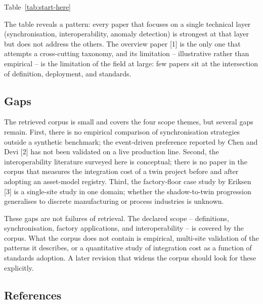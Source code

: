 \documentclass[
  12pt,
  a4paper,
]{article}
\begin{document}
Table~\ref{tab:start-here}

The table reveals a pattern: every paper that focuses on a single
technical layer (synchronisation, interoperability, anomaly detection)
is strongest at that layer but does not address the others. The overview
paper {[}1{]} is the only one that attempts a cross-cutting taxonomy,
and its limitation -- illustrative rather than empirical -- is the
limitation of the field at large: few papers sit at the intersection of
definition, deployment, and standards.

\hypertarget{gaps}{%
\subsection{Gaps}\label{gaps}}

The retrieved corpus is small and covers the four scope themes, but
several gaps remain. First, there is no empirical comparison of
synchronisation strategies outside a synthetic benchmark; the
event-driven preference reported by Chen and Devi {[}2{]} has not been
validated on a live production line. Second, the interoperability
literature surveyed here is conceptual; there is no paper in the corpus
that measures the integration cost of a twin project before and after
adopting an asset-model registry. Third, the factory-floor case study by
Eriksen {[}3{]} is a single-site study in one domain; whether the
shadow-to-twin progression generalises to discrete manufacturing or
process industries is unknown.

These gaps are not failures of retrieval. The declared scope --
definitions, synchronisation, factory applications, and interoperability
-- is covered by the corpus. What the corpus does not contain is
empirical, multi-site validation of the patterns it describes, or a
quantitative study of integration cost as a function of standards
adoption. A later revision that widens the corpus should look for these
explicitly.

\hypertarget{references}{%
\subsection{References}\label{references}}
\end{document}
